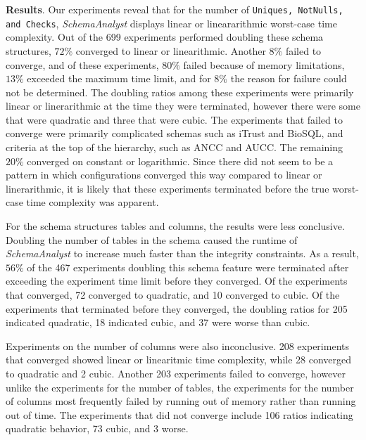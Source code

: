 \textbf{Results}. Our experiments reveal that for the number of \texttt{Uniques, NotNulls, and Checks},
\textit{SchemaAnalyst} displays linear or lineararithmic worst-case time complexity.  Out of the 699 experiments
performed doubling these schema structures, $72\%$ converged to linear or linearithmic.  Another $8\%$ failed to
converge, and of these experiments, $80\%$ failed because of memory limitations, $13\%$ exceeded the maximum time limit,
and for $8\%$ the reason for failure could not be determined.  The doubling ratios among these experiments were
primarily linear or linerarithmic at the time they were terminated, however there were some that were quadratic and
three that were cubic.  The experiments that failed to converge were primarily complicated schemas such as iTrust and
BioSQL, and criteria at the top of the hierarchy, such as ANCC and AUCC. The remaining $20\%$ converged on constant or
logarithmic.  Since there did not seem to be a pattern in which configurations converged this way compared to linear or
linerarithmic, it is likely that these experiments terminated before the true worst-case time complexity was apparent.

For the schema structures tables and columns, the results were less conclusive. Doubling the number of tables in the
schema caused the runtime of \textit{SchemaAnalyst} to increase much faster than the integrity constraints. As a result,
$56\%$ of the 467 experiments doubling this schema feature were terminated after exceeding the experiment time limit
before they converged.  Of the experiments that converged, 72 converged to quadratic, and 10 converged to cubic.  Of the
experiments that terminated before they converged, the doubling ratios for 205 indicated quadratic, 18 indicated cubic,
and 37 were worse than cubic.

Experiments on the number of columns were also inconclusive.  208 experiments that converged showed linear or
linearitmic time complexity, while 28 converged to quadratic and 2 cubic.  Another 203 experiments failed to converge,
however unlike the experiments for the number of tables, the experiments for the number of columns most frequently
failed by running out of memory rather than running out of time. The experiments that did not converge include 106
ratios indicating quadratic behavior, 73 cubic, and 3 worse.

